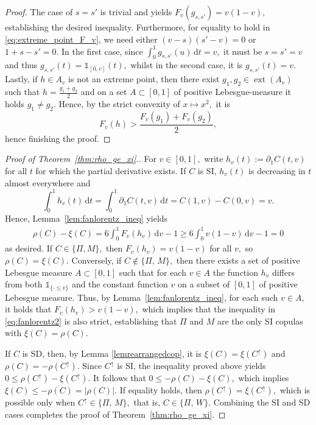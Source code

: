\documentclass{article}
\theoremstyle{plain}
\theoremstyle{definition}
\def\1{\mathds{1}} %
\newcommand{\de}{\mathrm{\,d}}
\begin{document}
\begin{proof}
The case of \(s=s'\) is trivial and yields \(F_v(g_{s,s'})=v(1-v),\) establishing the desired inequality.
Furthermore, for equality to hold in \eqref{eq:extreme_point_F_v}, we need either $(v-s)(s'-v)=0$ or $1+s-s'=0.$
In the first case, since $\int_0^1 g_{s,s'}(u)\de t=v,$ it must be $s=s'=v$ and thus $g_{s,s'}(t)= \1_{[0,v]}(t),$ whilst in the second case, it is $g_{s,s'}(t) = v.$
Lastly, if $h\in A_v$ is not an extreme point, then there exist $g_1,g_2\in \operatorname{ext}(A_v)$ such that $h=\frac{g_1+g_2}2$ and on a set $A\subset[0,1]$ of positive Lebesgue-measure it holds $g_1\neq g_2.$ 
Hence, by the strict convexity of $x\mapsto x^2,$ it is
\[
  F_v(h)
  > \frac{F_v(g_1) + F_v(g_2)}2
,\]
hence finishing the proof.
\end{proof} 

\begin{proof}[Proof of Theorem~\ref{thm:rho_ge_xi}.]
For \(v\in [0,1],\) write $h_v(t):=\partial_1 C(t,v)$ for all \(t\) for which the partial derivative exists.  
If \(C\) is SI, $h_v(t)$ is decreasing in $t$ almost everywhere and 
\[
  \int_{0}^{1}h_v(t)\de t = \int_0^1 \partial_1 C(t,v) \de t = C(1,v) - C(0,v) = v.
\]
Hence, Lemma~\ref{lem:fanlorentz_ineq} yields
\begin{align}\label{eq:fanlorentz2}
  \rho(C) - \xi(C)
  = 6\int_{0}^{1} F_v(h_v) \de v-1
  \ge 6 \int_0^1 v(1-v) \de v - 1 = 0
\end{align}
as desired.
If \(C\in \{\Pi,M\},\) then \(F_v(h_v) = v(1-v)\) for all \(v,\) so \(\rho(C) = \xi(C).\)
Conversely, if $C\notin\{\Pi,\,M\},$ then there exists a set of positive Lebesgue measure $A\subset[0,1]$ such that for each $v\in A$ the function $h_v$ differs from both $\1_{\{\cdot \le v\}}$ and the constant function $v$ on a subset of $[0,1]$ of positive Lebesgue measure.
Thus, by Lemma~\ref{lem:fanlorentz_ineq}, for each such $v\in A,$ it holds that $F_v(h_v) > v(1-v),$ which implies that the inequality in \eqref{eq:fanlorentz2} is also strict, establishing that $\Pi$ and $M$ are the only SI copulas with $\xi(C) = \rho(C).$

If $C$ is SD, then, by Lemma \ref{lemrearrangedcop}, it is $\xi(C) = \xi(C^\uparrow)$ and $\rho(C) = -\rho(C^\uparrow).$
Since $C^{\uparrow}$ is SI, the inequality proved above yields $0\le \rho(C^{\uparrow})-\xi(C^{\uparrow}).$ It follows that
\(
   0\le-\rho(C)-\xi(C)
,\)
which implies
\(
  \xi(C)\le -\rho(C)=|\rho(C)|.
\)
If equality holds, then $\rho(C^{\uparrow})=\xi(C^{\uparrow}),$ which is possible only when $C^{\uparrow}\in\{\Pi,\,M\},$ that is, $C\in\{\Pi,\,W\}.$
Combining the SI and SD cases completes the proof of Theorem~\ref{thm:rho_ge_xi}.
\end{proof}
\end{document}
